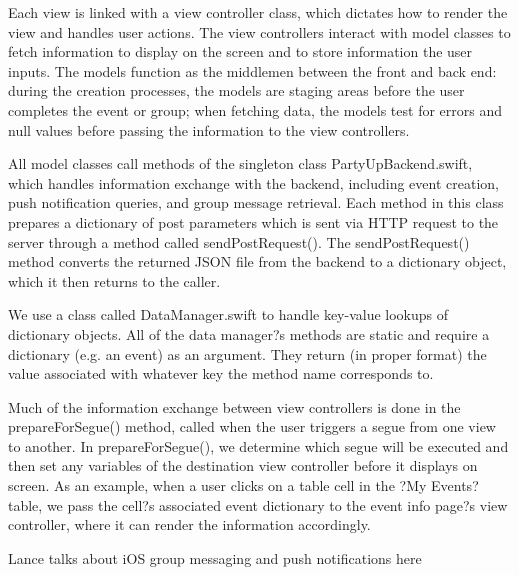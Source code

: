 \documentclass[12pt]{article}
\begin{document}
\bigskip

Each view is linked with a view controller class, which dictates how to render the view and handles user actions. The view controllers interact with model classes to fetch information to display on the screen and to store information the user inputs. The models function as the middlemen between the front and back end: during the creation processes, the models are staging areas before the user completes the event or group; when fetching data, the models test for errors and null values before passing the information to the view controllers.

\bigskip

All model classes call methods of the singleton class PartyUpBackend.swift, which handles information exchange with the backend, including event creation, push notification queries, and group message retrieval. Each method in this class prepares a dictionary of post parameters which is sent via HTTP request to the server through a method called sendPostRequest(). The sendPostRequest() method converts the returned JSON file from the backend to a dictionary object, which it then returns to the caller.

\bigskip

We use a class called DataManager.swift to handle key-value lookups of dictionary objects. All of the data manager?s methods are static and require a dictionary (e.g. an event) as an argument. They return (in proper format) the value associated with whatever key the method name corresponds to. 

\bigskip

Much of the information exchange between view controllers is done in the prepareForSegue() method, called when the user triggers a segue from one view to another. In prepareForSegue(), we determine which segue will be executed and then set any variables of the destination view controller before it displays on screen. As an example, when a user clicks on a table cell in the ?My Events? table, we pass the cell?s associated event dictionary to the event info page?s view controller, where it can render the information accordingly. 

\bigskip

Lance talks about iOS group messaging and push notifications here
\end{document}
